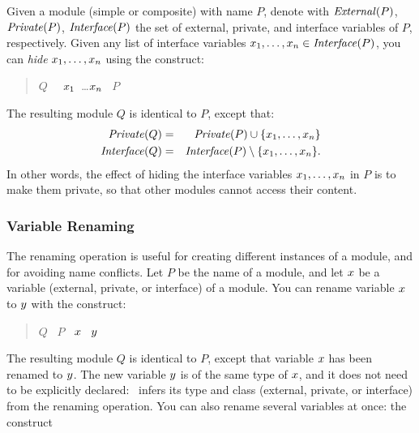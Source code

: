 {Given a module (simple or composite) with name $P$, denote with
$\mbox{\it External\/}(P)$, $\mbox{\it Private\/}(P)$, $\mbox{\it Interface\/}(P)$ the set of external,
private, and interface variables of $P$, respectively.  Given any list
of interface variables $x_1, \ldots, x_n \in \mbox{\it Interface\/}(P)$, you 
can {\em hide\/} $x_1, \ldots, x_n$ using the construct:
%
\begin{quote}
  $Q$ \ASSIGN\ \HIDE\  $x_1$\COMA\ \ldots \COMA$x_n$ \IN\
      $P$ \ENDHIDE
\end{quote}
%
The resulting module $Q$ is identical to $P$, except that: 
%
\begin{eqnarray*}
  \mbox{\it Private\/}(Q) & = & \mbox{\it Private\/}(P) \cup \{ x_1, \ldots, x_n \} \\
  \mbox{\it Interface\/}(Q) & = & \mbox{\it Interface\/}(P) \setminus \{ x_1, \ldots, x_n \} . 
\end{eqnarray*}
%
In other words, the effect of hiding the interface variables $x_1,
\ldots, x_n$ in $P$ is to make them private, so that other modules
cannot access their content.


\subsubsection{Variable Renaming}

The renaming operation is useful for creating different instances of a 
module, and for avoiding name conflicts. 
Let $P$ be the name of a module, and let $x$ be a variable
(external, private, or interface) of a module. You can rename variable
$x$ to $y$ with the construct: 

\begin{quote}
$Q$ \ASSIGN\ $P$ \LSQBRAC\ $x$ \ASSIGN\ $y$ \RSQBRAC 
\end{quote}

The resulting module $Q$ is identical to $P$, except that variable
$x$ has been renamed to $y$.  The new variable $y$ is of
the same type of $x$, and it does not need to be explicitly
declared: \mocha\ infers its type and class (external, private, or
interface) from the renaming operation.
You can also rename several variables at once: the construct

}
